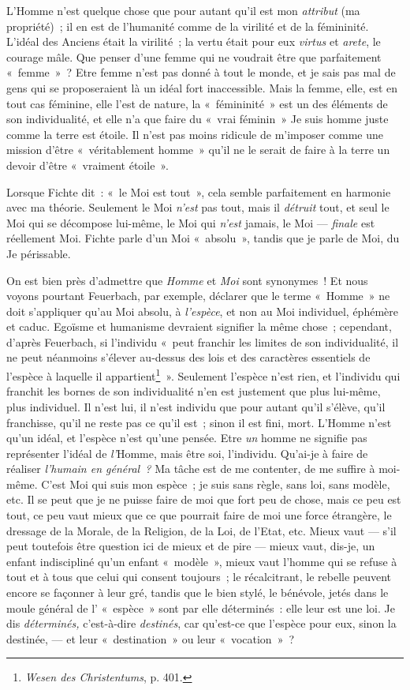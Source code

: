 \documentclass[french,twoside]{book} %
\begin{document}
L’Homme n’est quelque chose que pour autant qu’il est mon \emph{attribut} (ma propriété) ; il en est de l’humanité comme de la virilité et de la fémininité. L’idéal des Anciens était la virilité ; la vertu était pour eux \emph{virtus} et \emph{arete}, le courage mâle. Que penser d’une femme qui ne voudrait être que parfaitement « femme » ? Etre femme n’est pas donné à tout le monde, et je sais pas mal de gens qui se proposeraient là un idéal fort inaccessible. Mais la femme, elle, est en tout cas féminine, elle l’est de nature, la « fémininité » est un des éléments de son individualité, et elle n’a que faire du « vrai féminin » Je suis homme juste comme la terre est étoile. Il n’est pas moins ridicule de m’imposer comme une mission d’être « véritablement homme » qu’il ne le serait de faire à la terre un devoir d’être « vraiment étoile ».\par
Lorsque Fichte dit : « le Moi est tout », cela semble parfaitement en harmonie avec ma théorie. Seulement le Moi \emph{n’est} pas tout, mais il \emph{détruit} tout, et seul le Moi qui se décompose lui-même, le Moi qui \emph{n’est} jamais, le Moi — \emph{finale} est réellement Moi. Fichte parle d’un Moi « absolu », tandis que je parle de Moi, du Je périssable.\par
On est bien près d’admettre que \emph{Homme} et \emph{Moi}  sont synonymes ! Et nous voyons pourtant Feuerbach, par exemple, déclarer que le terme « Homme » ne doit s’appliquer qu’au Moi absolu, à \emph{l’espèce}, et non au Moi individuel, éphémère et caduc. Egoïsme et humanisme devraient signifier la même chose ; cependant, d’après Feuerbach, si l’individu « peut franchir les limites de son individualité, il ne peut néanmoins s’élever au-dessus des lois et des caractères essentiels de l’espèce à laquelle il appartient\footnote{ \noindent \emph{Wesen des Christentums}, p. 401.
 } ». Seulement l’espèce n’est rien, et l’individu qui franchit les bornes de son individualité n’en est justement que plus lui-même, plus individuel. Il n’est lui, il n’est individu que pour autant qu’il s’élève, qu’il franchisse, qu’il ne reste pas ce qu’il est ; sinon il est fini, mort. L’Homme n’est qu’un idéal, et l’espèce n’est qu’une pensée. Etre \emph{un} homme ne signifie pas représenter l’idéal de \emph{l’}Homme, mais être soi, l’individu. Qu’ai-je à faire de réaliser \emph{l’humain en général ?} Ma tâche est de me contenter, de me suffire à moi-même. C’est Moi qui suis mon espèce ; je suis sans règle, sans loi, sans modèle, etc. Il se peut que je ne puisse faire de moi que fort peu de chose, mais ce peu est tout, ce peu vaut mieux que ce que pourrait faire de moi une force étrangère, le dressage de la Morale, de la Religion, de la Loi, de l’Etat, etc. Mieux vaut — s’il peut toutefois être question ici de mieux et de pire — mieux vaut, dis-je, un enfant indiscipliné qu’un enfant « modèle », mieux vaut l’homme qui se refuse à tout et à tous que celui qui consent toujours ; le récalcitrant, le rebelle peuvent encore se façonner à leur gré, tandis que le bien stylé, le bénévole, jetés dans le moule général de l’ « espèce » sont par elle déterminés : elle leur est une loi. Je dis \emph{déterminés, }c’est-à-dire \emph{destinés}, car qu’est-ce que l’espèce pour eux, sinon la destinée, — et leur « destination » ou leur « vocation » ?\par
\end{document}
